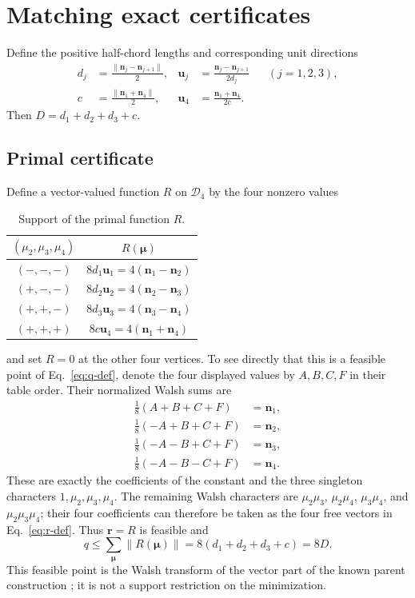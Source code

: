 \documentclass[aps,pra,reprint,superscriptaddress,nofootinbib,longbibliography]{revtex4-2}
\newcommand{\bmnu}{\bm{\mu}}
\newcommand{\bn}{\bm n}
\newcommand{\bu}{\bm u}
\begin{document}
\section{Matching exact certificates}
\label{sec:certificate}

Define the positive half-chord lengths and corresponding unit directions
\begin{align}
 d_j&=\frac{\|\bn_j-\bn_{j+1}\|}{2},&
 \bu_j&=\frac{\bn_j-\bn_{j+1}}{2d_j}
 &&(j=1,2,3),
 \label{eq:chord-defs}\\
 c&=\frac{\|\bn_1+\bn_4\|}{2},&
 \bu_4&=\frac{\bn_1+\bn_4}{2c}.
 \label{eq:endpoint-defs}
\end{align}
Then $D=d_1+d_2+d_3+c$.

\subsection{Primal certificate}

Define a vector-valued function $R$ on $\mathcal D_4$ by the four nonzero
values
\begin{table}[b]
 \caption{Support of the primal function $R$.}
 \label{tab:primal}
 \begin{ruledtabular}
 \begin{tabular}{cc}
 $(\mu_2,\mu_3,\mu_4)$ & $R(\bmnu)$ \\
 \hline
 $(-,-,-)$ & $8d_1\bu_1=4(\bn_1-\bn_2)$ \\
 $(+,-,-)$ & $8d_2\bu_2=4(\bn_2-\bn_3)$ \\
 $(+,+,-)$ & $8d_3\bu_3=4(\bn_3-\bn_4)$ \\
 $(+,+,+)$ & $8c\bu_4=4(\bn_1+\bn_4)$
 \end{tabular}
 \end{ruledtabular}
\end{table}
and set $R=0$ at the other four vertices.  To see directly that this is a
feasible point of Eq.~\eqref{eq:q-def}, denote the four displayed values by
$A,B,C,F$ in their table order.  Their normalized Walsh sums are
\begin{align}
 \tfrac18(A+B+C+F)&=\bn_1,\nonumber\\
 \tfrac18(-A+B+C+F)&=\bn_2,\nonumber\\
 \tfrac18(-A-B+C+F)&=\bn_3,\nonumber\\
 \tfrac18(-A-B-C+F)&=\bn_4.
 \label{eq:low-walsh}
\end{align}
These are exactly the coefficients of the constant and the three singleton
characters $1,\mu_2,\mu_3,\mu_4$.  The remaining Walsh characters are
$\mu_2\mu_3$, $\mu_2\mu_4$, $\mu_3\mu_4$, and
$\mu_2\mu_3\mu_4$; their four coefficients can therefore be taken as the
four free vectors in Eq.~\eqref{eq:r-def}.  Thus $\bm r=R$ is feasible and
\begin{equation}
 q\leq\sum_{\bmnu}\|R(\bmnu)\|
 =8(d_1+d_2+d_3+c)=8D.
 \label{eq:primal-bound}
\end{equation}
This feasible point is the Walsh transform of the vector part of the known
parent construction \cite{AndrejicKunjwal2020}; it is not a support
restriction on the minimization.
\end{document}
